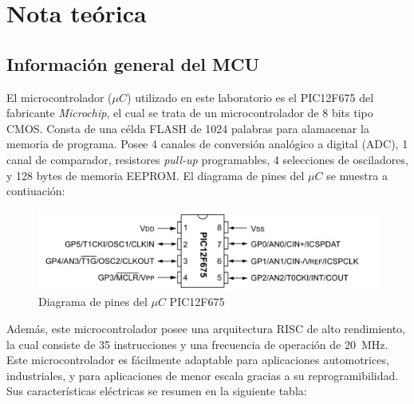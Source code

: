 \section{Nota teórica}
\subsection{Información general del MCU}

El microcontrolador ($\mu C$) utilizado en este laboratorio es el PIC12F675 del fabricante \textit{Microchip}, el cual se trata de un microcontrolador de 8 bits tipo CMOS. 
Consta de una célda FLASH de 1024 palabras para alamacenar la memoria de programa. Posee 4 canales de conversión analógico a digital (ADC), 1 canal de comparador, resistores \textit{pull-up} programables, 4 selecciones de osciladores, y 128 bytes de memoria EEPROM.
El diagrama de pines del $\mu C$ se muestra a contiuación:

\begin{figure}[!h]
    \centering
    \includegraphics[width = 0.8\linewidth]{imagenes/fig1.png}
    \caption{Diagrama de pines del $\mu C$ PIC12F675}
    \label{fig1}
\end{figure}

Además, este microcontrolador posee una arquitectura RISC de alto rendimiento, la cual consiste de 35 instrucciones y una frecuencia de operación de \SI{20}{MHz}. 
Este microcontrolador es fácilmente adaptable para aplicaciones automotrices, industriales, y para aplicaciones de menor escala gracias a su reprogramibilidad. 
Sus características eléctricas se resumen en la siguiente tabla:

